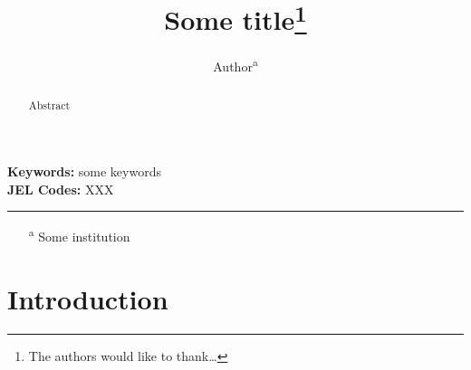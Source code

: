 \documentclass[9pt,a4paper]{article}
\begin{document}
\title{Some title\thanks{The authors would like to thank\dots}}


\author{
	Author\textsuperscript{a}
}

\maketitle

\begin{abstract}
Abstract
\end{abstract}

\bigskip \small \noindent \textbf{Keywords:} some keywords \\[-4 pt]

\small \noindent \textbf{JEL Codes:} XXX \\[-4 pt]

\noindent\rule{4.8 cm}{0.5 pt}
\begin{footnotesize}
	\begin{itemize}
		\item[\textsuperscript{a}] Some institution 				
	\end{itemize}
\end{footnotesize}

\newpage


\section{Introduction}\label{sec:intro}


\begin{footnotesize}
	
	
\end{footnotesize}
\end{document}
